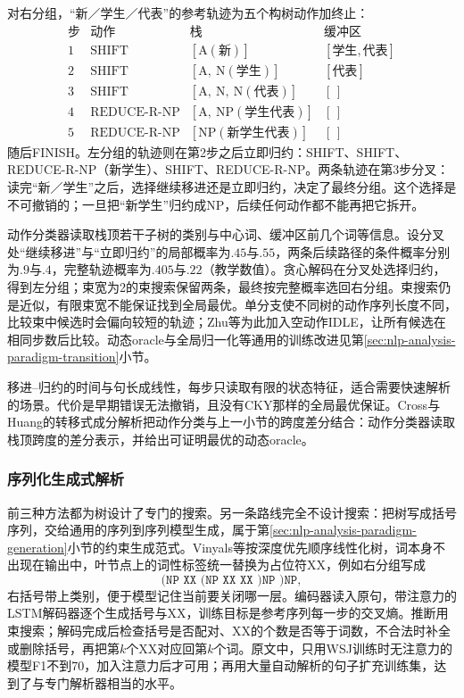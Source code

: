 对右分组，“新／学生／代表”的参考轨迹为五个构树动作加终止：
\[
\begin{array}{llll}
 \text{步}&\text{动作}&\text{栈}&\text{缓冲区}\\
 1&\mathrm{SHIFT}&[\mathrm A(\text{新})]&[\text{学生},\text{代表}]\\
 2&\mathrm{SHIFT}&[\mathrm A,\ \mathrm N(\text{学生})]&[\text{代表}]\\
 3&\mathrm{SHIFT}&[\mathrm A,\ \mathrm N,\ \mathrm N(\text{代表})]&[\,]\\
 4&\mathrm{REDUCE\mbox{-}R\mbox{-}NP}&[\mathrm A,\ \mathrm{NP}(\text{学生代表})]&[\,]\\
 5&\mathrm{REDUCE\mbox{-}R\mbox{-}NP}&[\mathrm{NP}(\text{新学生代表})]&[\,]
\end{array}
\]
随后FINISH。左分组的轨迹则在第2步之后立即归约：SHIFT、SHIFT、REDUCE-R-NP（新学生）、SHIFT、REDUCE-R-NP。两条轨迹在第3步分叉：读完“新／学生”之后，选择继续移进还是立即归约，决定了最终分组。这个选择是不可撤销的；一旦把“新学生”归约成NP，后续任何动作都不能再把它拆开。

动作分类器读取栈顶若干子树的类别与中心词、缓冲区前几个词等信息。设分叉处“继续移进”与“立即归约”的局部概率为$.45$与$.55$，两条后续路径的条件概率分别为$.9$与$.4$，完整轨迹概率为$.405$与$.22$（教学数值）。贪心解码在分叉处选择归约，得到左分组；束宽为2的束搜索保留两条，最终按完整概率选回右分组。束搜索仍是近似，有限束宽不能保证找到全局最优。单分支使不同树的动作序列长度不同，比较束中候选时会偏向较短的轨迹；Zhu等为此加入空动作IDLE，让所有候选在相同步数后比较。动态oracle与全局归一化等通用的训练改进见第\ref{sec:nlp-analysis-paradigm-transition}小节。

移进--归约的时间与句长成线性，每步只读取有限的状态特征，适合需要快速解析的场景。代价是早期错误无法撤销，且没有CKY那样的全局最优保证。Cross与Huang的转移式成分解析把动作分类与上一小节的跨度差分结合：动作分类器读取栈顶跨度的差分表示，并给出可证明最优的动态oracle。

\subsubsection{序列化生成式解析}
\label{sec:nlp-analysis-seq2seq-parsing}

前三种方法都为树设计了专门的搜索。另一条路线完全不设计搜索：把树写成括号序列，交给通用的序列到序列模型生成，属于第\ref{sec:nlp-analysis-paradigm-generation}小节的约束生成范式。Vinyals等按深度优先顺序线性化树，词本身不出现在输出中，叶节点上的词性标签统一替换为占位符XX，例如右分组写成
\[
 \texttt{(NP XX (NP XX XX )NP )NP},
\]
右括号带上类别，便于模型记住当前要关闭哪一层。编码器读入原句，带注意力的LSTM解码器逐个生成括号与XX，训练目标是参考序列每一步的交叉熵。推断用束搜索；解码完成后检查括号是否配对、XX的个数是否等于词数，不合法时补全或删除括号，再把第$k$个XX对应回第$k$个词。原文中，只用WSJ训练时无注意力的模型F1不到70，加入注意力后才可用；再用大量自动解析的句子扩充训练集，达到了与专门解析器相当的水平。

